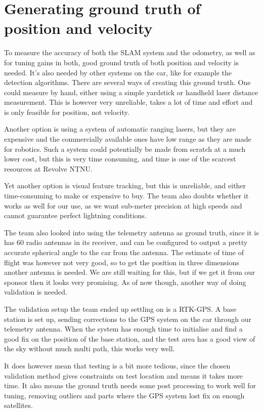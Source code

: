 \section{Generating ground truth of position and velocity}

To measure the accuracy of both the \gls{SLAM} system and the odometry, as well as for tuning gains in both, good ground truth of both position and velocity is needed. It's also needed by other systems on the car, like for example the detection algorithms. There are several ways of creating this ground truth. One could measure by hand, either using a simple yardstick or handheld laser distance measurement. This is however very unreliable, takes a lot of time and effort and is only feasible for position, not velocity.

Another option is using a system of automatic ranging lasers, but they are expensive and the commercially available ones have low range as they are made for robotics. Such a system could potentially be made from scratch at a much lower cost, but this is very time consuming, and time is one of the scarcest resources at Revolve NTNU. 

Yet another option is visual feature tracking, but this is unreliable, and either time-consuming to make or expensive to buy. The team also doubts whether it works as well for our use, as we want sub-meter precision at high speeds and cannot guarantee perfect lightning conditions. 

The team also looked into using the telemetry antenna as ground truth, since it is has $60$ radio antennas in its receiver, and can be configured to output a pretty accurate spherical angle to the car from the antenna. The estimate of time of flight was however not very good, so to get the position in three dimensions another antenna is needed. We are still waiting for this, but if we get it from our sponsor then it looks very promising. As of now though, another way of doing validation is needed. 

The validation setup the team ended up settling on is a \gls{RTK-GPS}. A base station is set up, sending corrections to the \gls{GPS} system on the car through our telemetry antenna. When the system has enough time to initialise and find a good fix on the position of the base station, and the test area has a good view of the sky without much multi path, this works very well. 

It does however mean that testing is a bit more tedious, since the chosen validation method gives constraints on test location and means it takes more time. It also means the ground truth needs some post processing to work well for tuning, removing outliers and parts where the \gls{GPS} system lost fix on enough satellites.